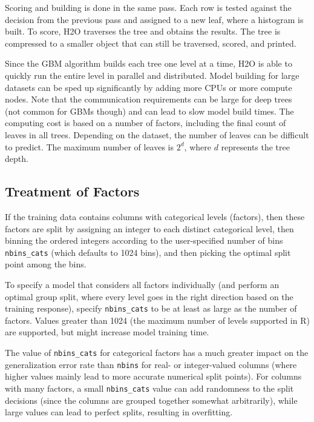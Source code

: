Scoring and building is done in the same pass. Each row is tested against the decision from the previous pass and assigned
to a new leaf, where a histogram is built. To score, H2O traverses the tree and obtains the results. The
tree is compressed to a smaller object that can still be traversed, scored, and printed.

Since the GBM algorithm builds each tree one level at a time, H2O is able to quickly run the entire level in
parallel and distributed. Model building for large datasets can be sped up significantly by adding more CPUs or more compute nodes.
Note that the communication requirements can be large for deep trees (not common for GBMs though) and can lead to slow model build times. 
The computing cost is based on a number of factors, including the final count of leaves in all trees. Depending on the dataset, the number of leaves can be
difficult to predict. The maximum number of leaves is $2^d$, where $d$ represents the tree depth.

\subsection{Treatment of Factors}

If the training data contains columns with categorical levels (factors), then these factors are split by assigning an integer to each distinct
categorical level, then binning the ordered integers according to the user-specified number of bins \texttt{nbins\_cats} (which defaults to 1024 bins),
and then picking the optimal split point among the bins.

To specify a model that considers all factors individually (and perform an optimal group split,
where every level goes in the right direction based on the training response), specify \texttt{nbins\_cats} to be at least as large as the number of factors.
Values greater than 1024 (the maximum number of levels supported in R) are supported, but might increase model training time.

The value of \texttt{nbins\_cats} for categorical factors has a much greater impact on the generalization error rate than \texttt{nbins} for real- or integer-valued columns (where higher values mainly lead to more accurate numerical split points).
For columns with many factors, a small \texttt{nbins\_cats} value can add randomness to the split decisions (since the columns are grouped together somewhat arbitrarily), while large values can lead to perfect splits, resulting in overfitting.

